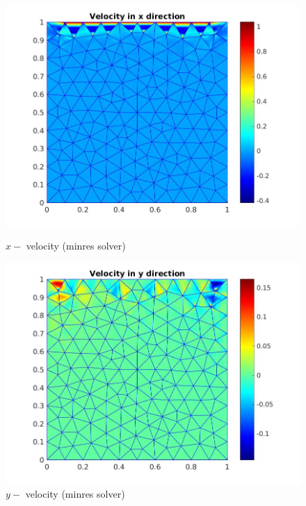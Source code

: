 \documentclass[a4paper]{book}
\begin{document}
\begin{figure}
  \begin{minipage}[c]{0.67\textwidth}
    \includegraphics[width=\textwidth]{lid_minres_vx.jpg}
  \end{minipage}\hfill
  \begin{minipage}[c]{0.3\textwidth}
    \caption{$x-$ velocity (minres solver)} \label{x_vel_stoke_minres_lid}
  \end{minipage}
  \begin{minipage}[c]{0.67\textwidth}
    \includegraphics[width=\textwidth]{lid_minres_vy.jpg}
  \end{minipage}\hfill
  \begin{minipage}[c]{0.3\textwidth}
    \caption{$y-$ velocity (minres solver)} \label{y_vel_stoke_minres_lid}

\end{minipage}
\end{figure}
\end{document}

